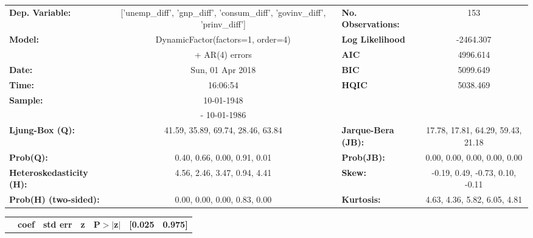 \documentclass{report}
\begin{document}
\begin{center}
\begin{tabular}{lclc}
\toprule
\textbf{Dep. Variable:}          & ['unemp_diff', 'gnp_diff', 'consum_diff', 'govinv_diff', 'prinv_diff'] & \textbf{  No. Observations:  } &                153                 \\
\textbf{Model:}                  &                   DynamicFactor(factors=1, order=4)                    & \textbf{  Log Likelihood     } &             -2464.307              \\
\textbf{}                        &                             + AR(4) errors                             & \textbf{  AIC                } &              4996.614              \\
\textbf{Date:}                   &                            Sun, 01 Apr 2018                            & \textbf{  BIC                } &              5099.649              \\
\textbf{Time:}                   &                                16:06:54                                & \textbf{  HQIC               } &              5038.469              \\
\textbf{Sample:}                 &                               10-01-1948                               & \textbf{                     } &                                    \\
\textbf{}                        &                              - 10-01-1986                              & \textbf{                     } &                                    \\
\textbf{Ljung-Box (Q):}          & 41.59, 35.89, 69.74, 28.46, 63.84 & \textbf{  Jarque-Bera (JB):  } & 17.78, 17.81, 64.29, 59.43, 21.18  \\
\textbf{Prob(Q):}                &    0.40, 0.66, 0.00, 0.91, 0.01   & \textbf{  Prob(JB):          } &    0.00, 0.00, 0.00, 0.00, 0.00    \\
\textbf{Heteroskedasticity (H):} &    4.56, 2.46, 3.47, 0.94, 4.41   & \textbf{  Skew:              } &  -0.19, 0.49, -0.73, 0.10, -0.11   \\
\textbf{Prob(H) (two-sided):}    &    0.00, 0.00, 0.00, 0.83, 0.00   & \textbf{  Kurtosis:          } &    4.63, 4.36, 5.82, 6.05, 4.81    \\
\bottomrule
\end{tabular}
\begin{tabular}{lcccccc}
                    & \textbf{coef} & \textbf{std err} & \textbf{z} & \textbf{P$>$$|$z$|$} & \textbf{[0.025} & \textbf{0.975]}  \\

\end{tabular}
\end{center}
\end{document}
